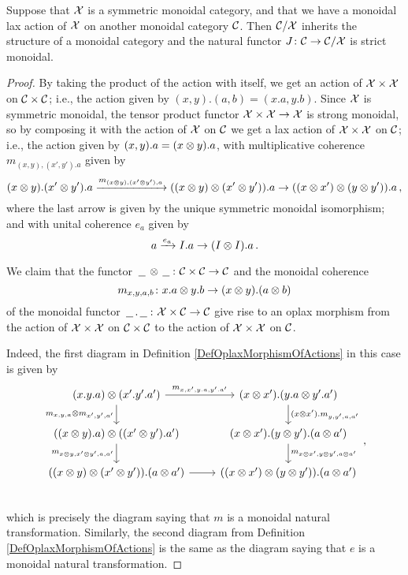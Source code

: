 \begin{proposition}
  Suppose that $\mathcal X$ is a symmetric monoidal category, and that we have a monoidal lax action of $\mathcal X$ on another monoidal category ${\mathcal{C}}$.  
  Then ${\mathcal{C}}/\mathcal X$ inherits the structure of a monoidal category and the natural functor $J\colon {\mathcal{C}} \to {\mathcal{C}}/\mathcal X$ is strict monoidal.
\end{proposition}
\begin{proof}
  By taking the product of the action with itself, we get an action of $\mathcal X\times\mathcal X$ on ${\mathcal{C}}\times{\mathcal{C}}$; i.e., the action given by $(x,y).(a,b)=(x.a,y.b)$.  
  Since $\mathcal X$ is symmetric monoidal, the tensor product functor $\mathcal X\times\mathcal X \to \mathcal X$ is strong monoidal, so by composing it with the action of $\mathcal X$ on ${\mathcal{C}}$ we get a lax action of $\mathcal X\times\mathcal X$ on ${\mathcal{C}}$; i.e., the action given by $(x,y).a = (x\otimes y).a$, with multiplicative coherence $m_{(x,y),(x',y').a}$ given by
  \[
    (x\otimes y).(x'\otimes y').a \xrightarrow{m_{(x\otimes y),(x'\otimes y'),a}}
    ((x\otimes y)\otimes (x'\otimes y')).a \to
    ((x\otimes x')\otimes (y\otimes y')).a\,,
    \]
  where the last arrow is given by the unique symmetric monoidal isomorphism; and with unital coherence $e_a$ given by
  \[
    a \xrightarrow{e_a}
    I.a \to
    (I \otimes I).a\,.
    \]

  We claim that the functor $\,\underline{\hspace{1.5ex}}\,\otimes\,\underline{\hspace{1.5ex}}\,\colon {\mathcal{C}}\times{\mathcal{C}}\to{\mathcal{C}}$ and the monoidal coherence
  \[
    m_{x,y,a,b} \colon x.a \otimes y.b \to (x\otimes y).(a\otimes b)
    \]
  of the monoidal functor $\,\underline{\hspace{1.5ex}}\,.\,\underline{\hspace{1.5ex}}\,\colon \mathcal X \times {\mathcal{C}} \to {\mathcal{C}}$ give rise to an oplax morphism from the action of $\mathcal X\times\mathcal X$ on ${\mathcal{C}}\times{\mathcal{C}}$ to the action of $\mathcal X\times\mathcal X$ on ${\mathcal{C}}$.

  Indeed, the first diagram in Definition \ref{DefOplaxMorphismOfActions} in this case is given by
  \[
    \begin{tikzcd}
      (x.y.a)\tensor(x'.y'.a') \arrow[r, "{m_{x,x',y.a,y'.a'}}"] \arrow[d, "{m_{x,y,a}\tensor m_{x',y',a'}}"']
        & (x\tensor x').(y.a \tensor y'.a') \arrow[d, "{(x\tensor x').m_{y,y',a,a'}}"] \\
      ((x\tensor y).a)\tensor ((x'\tensor y').a') \arrow[d, "{m_{x\tensor y,x'\tensor y',a,a'}}"']
        & (x \tensor x').(y\tensor y').(a \tensor a') \arrow[d, "{m_{x\tensor x',y\tensor y',a\tensor a'}}"] \\
      ((x\tensor y)\tensor (x'\tensor y')).(a\tensor a') \arrow[r]
        & ((x \tensor x')\tensor (y \tensor y')) . (a \tensor a') \\
    \end{tikzcd}\,,
    \]
  which is precisely the diagram saying that $m$ is a monoidal natural transformation.  
  Similarly, the second diagram from Definition \ref{DefOplaxMorphismOfActions} is the same as the diagram saying that $e$ is a monoidal natural transformation.  


\end{proof}
